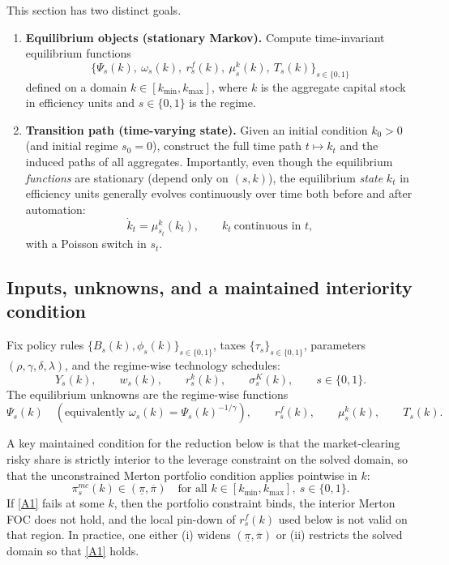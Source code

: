 \documentclass{article}
\begin{document}
This section has two distinct goals.

\begin{enumerate}
\item \textbf{Equilibrium objects (stationary Markov).} Compute time-invariant equilibrium functions
\[
\big\{\Psi_s(k),\ \omega_s(k),\ r^f_s(k),\ \mu^k_s(k),\ T_s(k)\big\}_{s\in\{0,1\}}
\]
defined on a domain $k\in[k_{\min},k_{\max}]$, where $k$ is the aggregate capital stock in efficiency
units and $s\in\{0,1\}$ is the regime.

\item \textbf{Transition path (time-varying state).} Given an initial condition $k_0>0$ (and initial regime
$s_0=0$), construct the full time path $t\mapsto k_t$ and the induced paths of all aggregates. Importantly,
even though the equilibrium \emph{functions} are stationary (depend only on $(s,k)$), the equilibrium
\emph{state} $k_t$ in efficiency units generally evolves continuously over time both before and after
automation:
\[
\dot k_t = \mu^k_{s_t}(k_t),\qquad k_t \ \text{continuous in } t,
\]
with a Poisson switch in $s_t$.
\end{enumerate}

\subsection{Inputs, unknowns, and a maintained interiority condition}
Fix policy rules $\{B_s(k),\phi_s(k)\}_{s\in\{0,1\}}$, taxes $\{\tau_s\}_{s\in\{0,1\}}$, parameters
$(\rho,\gamma,\delta,\lambda)$, and the regime-wise technology schedules:
\[
Y_s(k),\qquad w_s(k),\qquad r^k_s(k),\qquad \sigma^K_s(k),\qquad s\in\{0,1\}.
\]
The equilibrium unknowns are the regime-wise functions
\[
\Psi_s(k)\quad (\text{equivalently } \omega_s(k)=\Psi_s(k)^{-1/\gamma}),\qquad
r^f_s(k),\qquad \mu^k_s(k),\qquad T_s(k).
\]

A key maintained condition for the reduction below is that the market-clearing risky share is strictly
interior to the leverage constraint on the solved domain, so that the unconstrained Merton portfolio
condition applies pointwise in $k$:
\begin{equation}
\pi^{mc}_s(k)\in(\underline\pi,\overline\pi)\quad \text{for all } k \in [k_{\min},k_{\max}],\ s\in\{0,1\}.
\tag{A1}
\end{equation}
If \eqref{A1} fails at some $k$, then the portfolio constraint binds, the interior Merton FOC does not hold,
and the local pin-down of $r^f_s(k)$ used below is not valid on that region. In practice, one either (i)
widens $(\underline\pi,\overline\pi)$ or (ii) restricts the solved domain so that \eqref{A1} holds.
\end{document}
